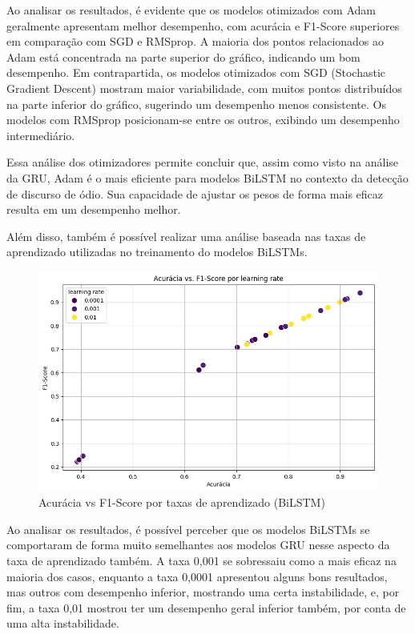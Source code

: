 \documentclass[conference]{IEEEtran}
\begin{document}
Ao analisar os resultados, é evidente que os modelos otimizados com Adam geralmente apresentam melhor desempenho, com acurácia e F1-Score superiores em comparação com SGD e RMSprop. A maioria dos pontos relacionados ao Adam está concentrada na parte superior do gráfico, indicando um bom desempenho. Em contrapartida, os modelos otimizados com SGD (Stochastic Gradient Descent) mostram maior variabilidade, com muitos pontos distribuídos na parte inferior do gráfico, sugerindo um desempenho menos consistente. Os modelos com RMSprop posicionam-se entre os outros, exibindo um desempenho intermediário.

Essa análise dos otimizadores permite concluir que, assim como visto na análise da GRU, Adam é o mais eficiente para modelos BiLSTM no contexto da detecção de discurso de ódio. Sua capacidade de ajustar os pesos de forma mais eficaz resulta em um desempenho melhor.

Além disso, também é possível realizar uma análise baseada nas taxas de aprendizado utilizadas no treinamento do modelos BiLSTMs.

\begin{figure}[h!]
    \centering
    \includegraphics[width=\linewidth]{images/bilstm-lr.png}
    \caption{Acurácia vs F1-Score por taxas de aprendizado (BiLSTM)}
    \label{fig:exemplo5}
\end{figure}

Ao analisar os resultados, é possível perceber que os modelos BiLSTMs se comportaram de forma muito semelhantes aos modelos GRU nesse aspecto da taxa de aprendizado também. A taxa 0,001 se sobressaiu como a mais eficaz na maioria dos casos, enquanto a taxa 0,0001 apresentou alguns bons resultados, mas outros com desempenho inferior, mostrando uma certa instabilidade, e, por fim, a taxa 0,01 mostrou ter um desempenho geral inferior também, por conta de uma alta instabilidade.
\end{document}

